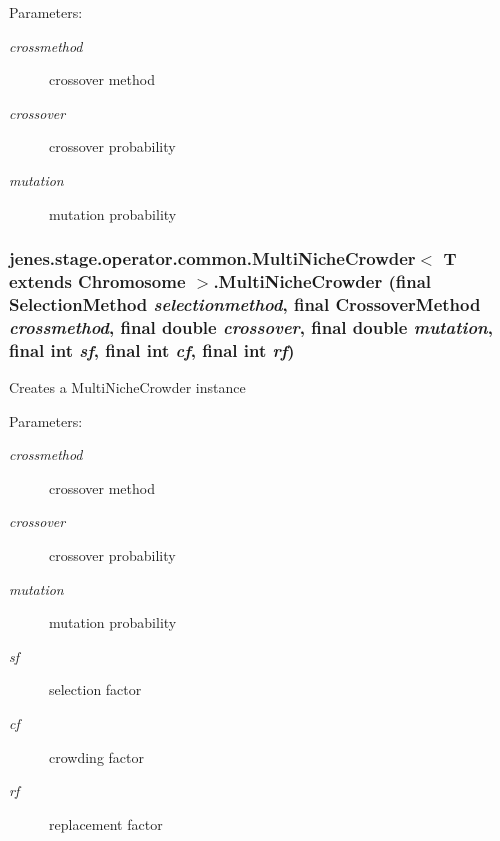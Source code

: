 \begin{Desc}
\item[Parameters:]
\begin{description}
\item[{\em crossmethod}]crossover method \item[{\em crossover}]crossover probability \item[{\em mutation}]mutation probability \end{description}
\end{Desc}
\hypertarget{classjenes_1_1stage_1_1operator_1_1common_1_1_multi_niche_crowder_3_01_t_01extends_01_chromosome_01_4_7384c823b16fe8e5f8bfdc7db0c87ce5}{
\subsubsection[MultiNicheCrowder]{\setlength{\rightskip}{0pt plus 5cm}jenes.stage.operator.common.MultiNicheCrowder$<$ T extends Chromosome $>$.MultiNicheCrowder (final {\bf SelectionMethod} {\em selectionmethod}, \/  final {\bf CrossoverMethod} {\em crossmethod}, \/  final double {\em crossover}, \/  final double {\em mutation}, \/  final int {\em sf}, \/  final int {\em cf}, \/  final int {\em rf})}}
\label{classjenes_1_1stage_1_1operator_1_1common_1_1_multi_niche_crowder_3_01_t_01extends_01_chromosome_01_4_7384c823b16fe8e5f8bfdc7db0c87ce5}


Creates a MultiNicheCrowder instance

\begin{Desc}
\item[Parameters:]
\begin{description}
\item[{\em crossmethod}]crossover method \item[{\em crossover}]crossover probability \item[{\em mutation}]mutation probability \item[{\em sf}]selection factor \item[{\em cf}]crowding factor \item[{\em rf}]replacement factor \end{description}
\end{Desc}


